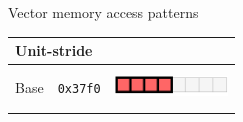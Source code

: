 \documentclass[11pt,aspectratio=169]{beamer}
\newcommand{\code}[1]{\texttt{#1}}
\begin{document}
\begin{frame}{Vector memory access patterns}
\newcommand{\basetocap}{Base \only<1>{address}\only<2>{\alert{capability}}}
\newcommand{\basetocapaddr}{\only<2>{{\footnotesize \code{0x3700.. }}}\code{0x37f0}\only<2>{{\footnotesize  \code{ ..0x3800}}}}

    
    \begin{tabular}{p{3cm}>{\centering\arraybackslash}p{6.75cm}>{\centering\arraybackslash}p{3cm}}
    \toprule
    \multicolumn{3}{l}{\textbf{Unit-stride}} \\
    \midrule
    \basetocap{} & \basetocapaddr{} & \includegraphics[width=3cm,height=1cm,keepaspectratio]{figures/min-unit.pdf}\\
    

\end{tabular}
\end{frame}
\end{document}
